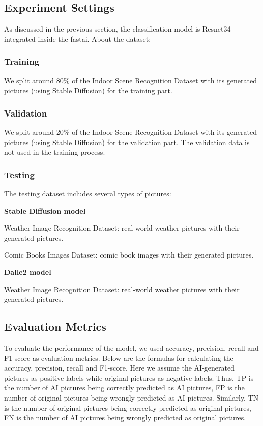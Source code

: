 \documentclass[11pt]{article}
\begin{document}
\subsection{Experiment Settings}

As discussed in the previous section, the classification model is Resnet34 integrated inside the fastai. About the dataset:

\subsubsection{Training}

We split around 80\% of the Indoor Scene Recognition Dataset with its generated pictures (using Stable Diffusion) for the training part.

\subsubsection{Validation}

We split around 20\% of the Indoor Scene Recognition Dataset with its generated pictures (using Stable Diffusion) for the validation part. The validation data is not used in the training process.

\subsubsection{Testing}

The testing dataset includes several types of pictures:

\textbf{Stable Diffusion model}

Weather Image Recognition Dataset: real-world weather pictures with their generated pictures.

Comic Books Images Dataset: comic book images with their generated pictures.

\textbf{Dalle2 model}

Weather Image Recognition Dataset: real-world weather pictures with their generated pictures.

\subsection{Evaluation Metrics}

To evaluate the performance of the model, we used accuracy, precision, recall and F1-score as evaluation metrics. Below are the formulas for calculating the accuracy, precision, recall and F1-score. Here we assume the AI-generated pictures as positive labels while original pictures as negative labels. Thus, TP is the number of AI pictures being correctly predicted as AI pictures, FP is the number of original pictures being wrongly predicted as AI pictures. Similarly, TN is the number of original pictures being correctly predicted as original pictures, FN is the number of AI pictures being wrongly predicted as original pictures.
\end{document}
